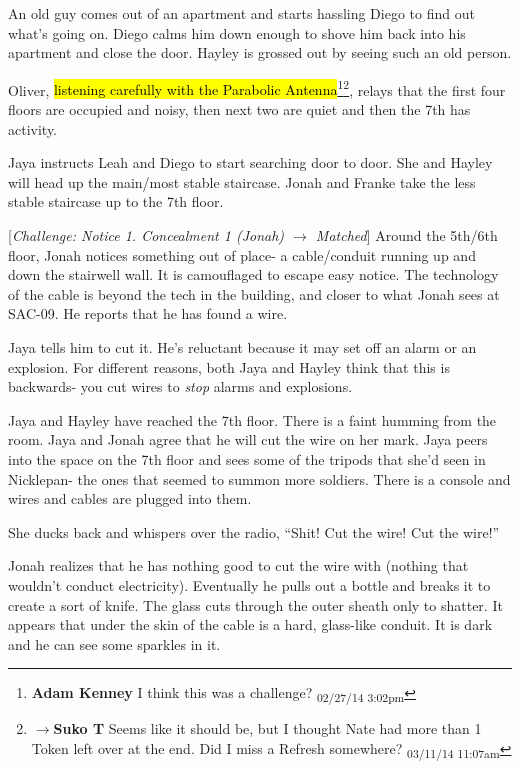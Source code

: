 An old guy comes out of an apartment and starts hassling Diego to find out what's going on.  Diego calms him down enough to shove him back into his apartment and close the door.  Hayley is grossed out by seeing such an old person.



Oliver, \hl{listening carefully with the Parabolic Antenna}\footnote{\textbf{Adam Kenney }I think this was a challenge? \textsubscript{02/27/14 3:02pm}}\footnote{$\rightarrow$\textbf{Suko T }Seems like it should be, but I thought Nate had more than 1 Token left over at the end.  Did I miss a Refresh somewhere? \textsubscript{03/11/14 11:07am}}, relays that the first four floors are occupied and noisy, then next two are quiet and then the 7th has activity.  



Jaya instructs Leah and Diego to start searching door to door.  She and Hayley will head up the main/most stable staircase.  Jonah and Franke take the less stable staircase up to the 7th floor.



{[}\textit{Challenge: Notice 1. Concealment 1 (Jonah) $\rightarrow$ Matched}{]} Around the 5th/6th floor, Jonah notices something out of place- a cable/conduit running up and down the stairwell wall.  It is camouflaged to escape easy notice.  The technology of the cable is beyond the tech in the building, and closer to what Jonah sees at SAC-09.  He reports that he has found a wire.



Jaya tells him to cut it.  He's reluctant because it may set off an alarm or an explosion.  For different reasons, both Jaya and Hayley think that this is backwards- you cut wires to \textit{stop }alarms and explosions.



Jaya and Hayley have reached the 7th floor.  There is a faint humming from the room.  Jaya and Jonah agree that he will cut the wire on her mark.  Jaya peers into the space on the 7th floor and sees some of the tripods that she'd seen in Nicklepan- the ones that seemed to summon more soldiers.  There is a console and wires and cables are plugged into them.

She ducks back and whispers over the radio, ``Shit!  Cut the wire!  Cut the wire!''



Jonah realizes that he has nothing good to cut the wire with (nothing that wouldn't conduct electricity). Eventually he pulls out a bottle and breaks it to create a sort of knife.  The glass cuts through the outer sheath only to shatter.  It appears that under the skin of the cable is a hard, glass-like conduit.  It is dark and he can see some sparkles in it.



